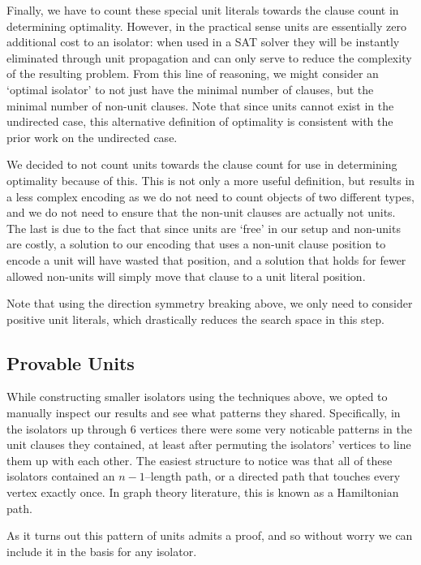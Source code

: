 \documentclass[a4paper,UKenglish,cleveref, autoref, thm-restate]{lipics-v2021}
\begin{document}
Finally, we have to count these special unit literals towards the clause count in determining optimality.  However, in the practical sense units are essentially zero additional cost to an isolator: when used in a SAT solver they will be instantly eliminated through unit propagation and can only serve to reduce the complexity of the resulting problem.  From this line of reasoning, we might consider an `optimal isolator' to not just have the minimal number of clauses, but the minimal number of non-unit clauses.  Note that since units cannot exist in the undirected case, this alternative definition of optimality is consistent with the prior work on the undirected case.

We decided to not count units towards the clause count for use in determining optimality because of this.  This is not only a more useful definition, but results in a less complex encoding as we do not need to count objects of two different types, and we do not need to ensure that the non-unit clauses are actually not units.  The last is due to the fact that since units are `free' in our setup and non-units are costly, a solution to our encoding that uses a non-unit clause position to encode a unit will have wasted that position, and a solution that holds for fewer allowed non-units will simply move that clause to a unit literal position.

Note that using the direction symmetry breaking above, we only need to consider positive unit literals, which drastically reduces the search space in this step.

\subsection{Provable Units}

While constructing smaller isolators using the techniques above, we opted to manually inspect our results and see what patterns they shared.  Specifically, in the isolators up through 6 vertices there were some very noticable patterns in the unit clauses they contained, at least after permuting the isolators' vertices to line them up with each other.  The easiest structure to notice was that all of these isolators contained an $n-1$--length path, or a directed path that touches every vertex exactly once.  In graph theory literature, this is known as a Hamiltonian path.

As it turns out this pattern of units admits a proof, and so without worry we can include it in the basis for any isolator.
\end{document}
